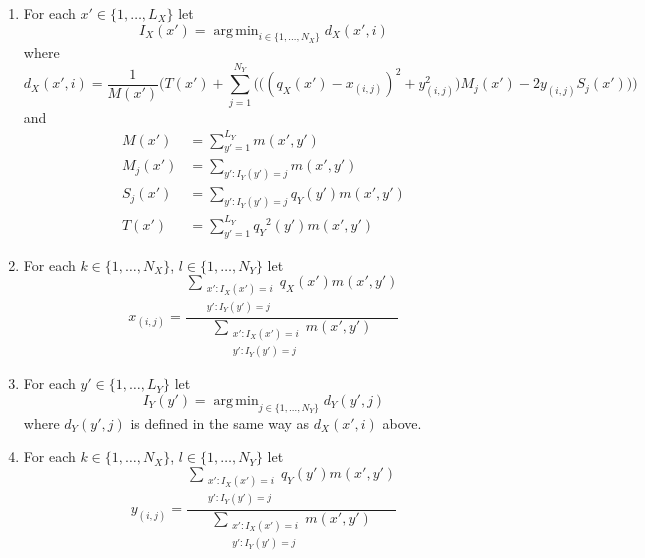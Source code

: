 \documentclass[10pt]{article}
\DeclareMathOperator*{\argmin}{arg\,min}
\begin{document}
\begin{enumerate}
\begin{enumerate}
            \item For each $x'\in \{1,\ldots,L_X\}$ let 
                \begin{equation*}
                    I_X(x')=\argmin_{i \in \{1,\dots,N_X\}}d_X(x',i)
                \end{equation*}
                where
                \begin{equation*}
                    d_X(x',i) =
                    \frac{1}{M(x')} \bigg(T(x') + 
                    \sum_{j=1}^{N_Y}
                    \Big(\big({(q_X(x')-x_{(i,j)})}^2 +
                    y_{(i,j)}^2\big)M_j(x') -2y_{(i,j)}S_j(x')\Big)\bigg)
                \end{equation*}
                and
                \begin{align*}
                    M(x') &= {\sum_{y'=1}^{L_Y}m(x',y')} \\
                    M_j(x') &= \sum_{y':I_Y(y')=j}m(x',y') \\
                    S_j(x') &= \sum_{y':I_Y(y')=j}q_Y(y')m(x',y') \\
                    T(x') &= \sum_{y'=1}^{L_Y}{q_Y}^2(y')m(x',y')
                \end{align*}

            \item For each $k\in\{1,\ldots,N_X\}$, $l\in\{1,\ldots,N_Y\}$ let
                \begin{equation*}
                    x_{(i,j)} = 
                    \frac{\sum_{\substack{x':I_X(x')=i\\y':I_Y(y')=j}}q_X(x')m(x',y')}
                    {\sum_{\substack{x':I_X(x')=i\\y':I_Y(y')=j}}m(x',y')}
                \end{equation*}

            \item For each $y'\in \{1,\ldots,L_Y\}$ let 
                \begin{equation*}
                    I_Y(y')=\argmin_{j \in \{1,\dots,N_Y\}}d_Y(y',j)
                \end{equation*}
                where $d_Y(y',j)$ is defined in the same way as $d_X(x',i)$
                above.

            \item For each $k\in\{1,\ldots,N_X\}$, $l\in\{1,\ldots,N_Y\}$ let
                \begin{equation*}
                    y_{(i,j)} = 
                    \frac{\sum_{\substack{x':I_X(x')=i\\y':I_Y(y')=j}}q_Y(y')m(x',y')}
                    {\sum_{\substack{x':I_X(x')=i\\y':I_Y(y')=j}}m(x',y')}
                \end{equation*}


\end{enumerate}
\end{enumerate}
\end{document}

